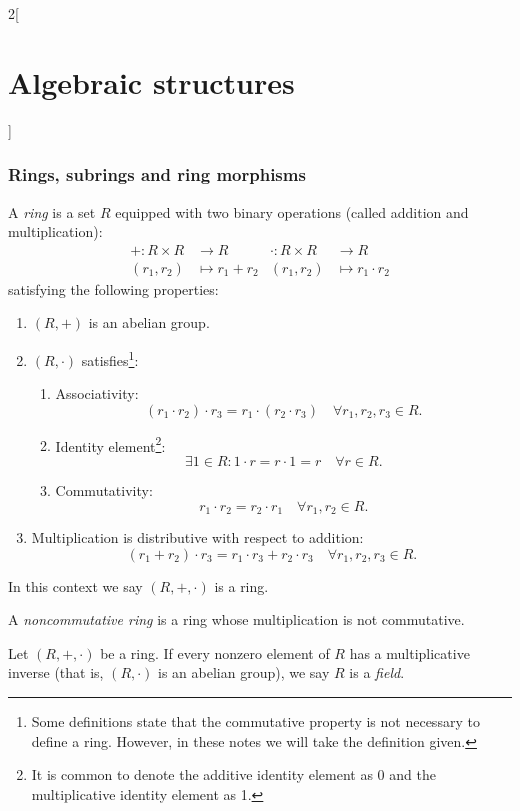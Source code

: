 \documentclass[../../../main.tex]{subfiles}
\begin{document}
\begin{multicols}{2}[\section{Algebraic structures}]
\subsubsection{Rings, subrings and ring morphisms}
\begin{definition}[Ring]
    A \textit{ring} is a set $R$ equipped with two binary operations (called addition and multiplication):
    \begin{align*}
        +:R\times R&\longrightarrow R&\cdot:R\times R&\longrightarrow R\\
        (r_1,r_2)&\longmapsto r_1+ r_2&(r_1,r_2)&\longmapsto r_1\cdot r_2
    \end{align*}
    satisfying the following properties:
    \begin{enumerate}
        \item $(R,+)$ is an abelian group.
        \item $(R,\cdot)$ satisfies\footnote{Some definitions state that the commutative property is not necessary to define a ring. However, in these notes we will take the definition given.}:
        \begin{enumerate}
            \item Associativity: $$(r_1\cdot r_2)\cdot r_3=r_1\cdot(r_2\cdot r_3)\quad\forall r_1,r_2,r_3\in R.$$
            \item Identity element\footnote{It is common to denote the additive identity element as 0 and the multiplicative identity element as 1.}: $$\exists 1\in R:1\cdot r=r\cdot 1=r\quad\forall r\in R.$$
            \item Commutativity: $$r_1\cdot r_2=r_2\cdot r_1\quad\forall r_1,r_2\in R.$$
        \end{enumerate}
        \item Multiplication is distributive with respect to addition: $$(r_1+r_2)\cdot r_3=r_1\cdot r_3+r_2\cdot r_3\quad\forall r_1,r_2,r_3\in R.$$
    \end{enumerate}
    In this context we say $(R,+,\cdot)$ is a ring.
\end{definition}
\begin{definition}
    A \textit{noncommutative ring} is a ring whose multiplication is not commutative.
\end{definition}
\begin{definition}[Field]
    Let $(R,+,\cdot)$ be a ring. If every nonzero element of $R$ has a multiplicative inverse (that is, $(R,\cdot)$ is an abelian group), we say $R$ is a \textit{field}.
\end{definition}

\end{multicols}
\end{document}
